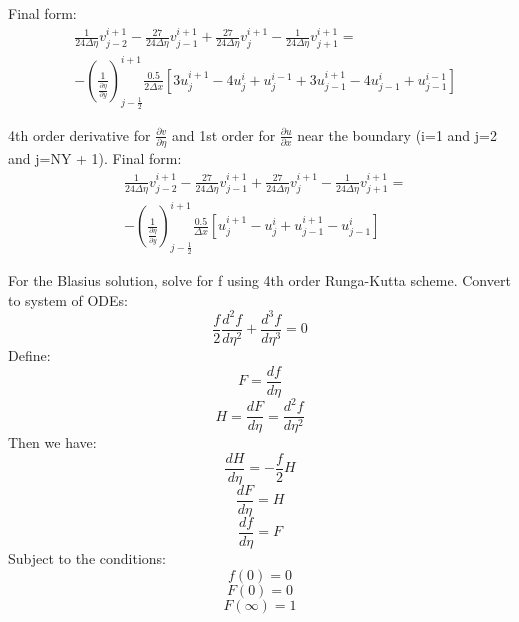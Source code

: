 \documentclass[letterpaper,12pt]{article}
\begin{document}
Final form:
\begin{equation}
\begin{aligned}
    &\frac{1}{24 \Delta \eta} v_{j-2}^{i+1} - \frac{27}{24 \Delta \eta} v_{j-1}^{i+1} + \frac{27}{24 \Delta \eta} v_{j}^{i+1} - \frac{1}{24 \Delta \eta} v_{j+1}^{i+1} = \\
    & - \left(\frac{1}{\frac{\partial \eta}{\partial y}} \right)^{i+1}_{j-\frac{1}{2}} \frac{0.5}{2 \Delta x} \left[ 3u_{j}^{i+1} - 4 u_{j}^{i} + u_{j}^{i-1} + 3 u_{j-1}^{i+1} - 4 u_{j-1}^{i} + u_{j-1}^{i-1} \right]
\end{aligned}
\end{equation}

4th order derivative for $\frac{\partial v}{\partial \eta}$ and 1st order for $\frac{\partial u}{\partial x}$ near the boundary (i=1 and j=2 and j=NY + 1). Final form:
\begin{equation}
\begin{aligned}
    &\frac{1}{24 \Delta \eta} v_{j-2}^{i+1} - \frac{27}{24 \Delta \eta} v_{j-1}^{i+1} + \frac{27}{24 \Delta \eta} v_{j}^{i+1} - \frac{1}{24 \Delta \eta} v_{j+1}^{i+1} = \\
    & - \left(\frac{1}{\frac{\partial \eta}{\partial y}} \right)^{i+1}_{j-\frac{1}{2}} \frac{0.5}{\Delta x} \left[ u_{j}^{i+1} - u_{j}^{i} + u_{j-1}^{i+1} - u_{j-1}^{i} \right]
\end{aligned}
\end{equation}

For the Blasius solution, solve for f using 4th order Runga-Kutta scheme. Convert to system of ODEs:
\begin{equation}
    \frac{f}{2} \frac{d^2 f}{d \eta^2} + \frac{d^3 f}{d \eta^3} = 0
\end{equation}
Define:
\begin{equation}
    F = \frac{d f}{d \eta}
\end{equation}
\begin{equation}
    H = \frac{d F}{d \eta} = \frac{d^2 f}{d \eta^2}
\end{equation}
Then we have:
\begin{equation}
    \frac{d H}{d \eta} = - \frac{f}{2} H
\end{equation}
\begin{equation}
    \frac{d F}{d \eta} = H
\end{equation}
\begin{equation}
    \frac{d f}{d \eta} = F
\end{equation}
Subject to the conditions:
\begin{equation}
    f(0) = 0
\end{equation}
\begin{equation}
    F(0) = 0
\end{equation}
\begin{equation}
    F(\infty) = 1
\end{equation}
\end{document}
